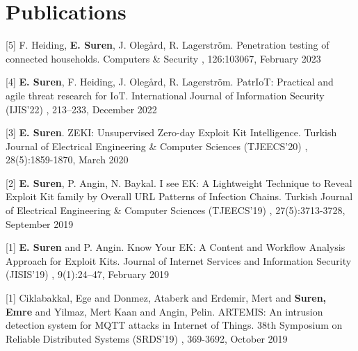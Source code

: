 

\section{Publications}



        \publicationsItem
            {[5] F. Heiding, \textbf{E. Suren}, J. Olegård, R. Lagerström.}
            {Penetration testing of connected households.}
            {Computers \& Security}
            {, 126:103067, }
            {February 2023}

        \publicationsItem
            {[4] \textbf{E. Suren}, F. Heiding, J. Olegård, R. Lagerström.} 
            {PatrIoT: Practical and agile threat research for IoT.} 
            {International Journal of Information Security (IJIS'22)}
            {, 213–233, }
            {December 2022}

        \publicationsItem
            {[3] \textbf{E. Suren}.} 
            {ZEKI: Unsupervised Zero-day Exploit Kit Intelligence.} 
            {Turkish Journal of Electrical Engineering \& Computer Sciences (TJEECS'20)}
            {, 28(5):1859-1870, } 
            {March 2020}

        \publicationsItem
            {[2] \textbf{E. Suren}, P. Angin, N. Baykal.} 
            {I see EK: A Lightweight Technique to Reveal Exploit Kit family by Overall URL Patterns of Infection Chains.} 
            {Turkish Journal of Electrical Engineering \& Computer Sciences (TJEECS'19)}
            {, 27(5):3713-3728, }
            {September 2019}

        \publicationsItem
            {[1] \textbf{E. Suren} and P. Angin.}
            {Know Your EK: A Content and Workflow Analysis Approach for Exploit Kits.}
            {Journal of Internet Services and Information Security (JISIS'19)}
            { , 9(1):24–47, }
            {February 2019}

    \itemizeCVEnd



        \publicationsItem
            {[1] Ciklabakkal, Ege and Donmez, Ataberk and Erdemir, Mert and \textbf{Suren, Emre} and Yilmaz, Mert Kaan and Angin, Pelin.} 
            {ARTEMIS: An intrusion detection system for MQTT attacks in Internet of Things.}
            {38th Symposium on Reliable Distributed Systems (SRDS'19)}
            {, 369-3692, }
            {October 2019}
        
    \itemizeCVEnd